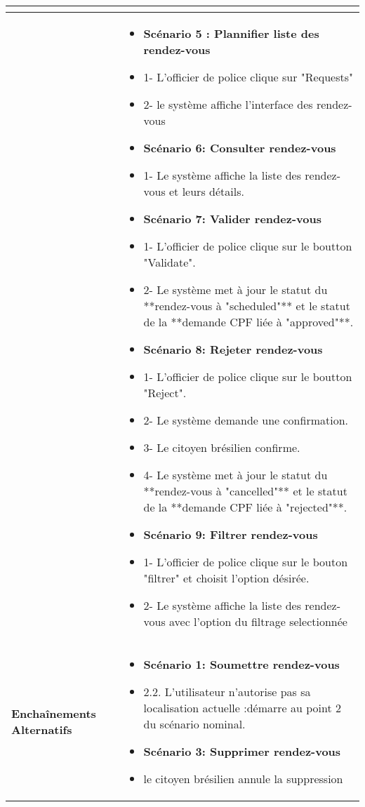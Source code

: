 \begin{longtable}{|>{\arraybackslash}p{4.2cm}|>{\arraybackslash}p{12.5cm}|}
\begin{itemize}[label=]
\end{itemize} \\
\hline
\textbf{}&
\begin{itemize}[label=]

      \item \textbf{Scénario 5 : Plannifier liste des rendez-vous}
            \item 1- L'officier de police clique sur "Requests"
            \item 2- le système affiche l'interface des rendez-vous
             \item\textbf{Scénario 6: Consulter rendez-vous }
            \item 1- Le système affiche la liste des rendez-vous et leurs détails.
      \item\textbf{Scénario 7: Valider rendez-vous }
            \item 1- L'officier de police clique sur le boutton "Validate".
            \item 2- Le système met à jour le statut du **rendez-vous à "scheduled"** et le statut de la **demande CPF liée à "approved"**.
 \item\textbf{Scénario 8: Rejeter rendez-vous }
            \item 1- L'officier de police clique sur le boutton "Reject".
            \item 2- Le système demande une confirmation.
            \item 3- Le citoyen brésilien confirme.
            \item 4- Le système met à jour le statut du **rendez-vous à "cancelled"** et le statut de la **demande CPF liée à "rejected"**.
          \item\textbf{Scénario 9:  Filtrer rendez-vous }
            \item 1- L'officier de police clique sur le bouton "filtrer" et choisit l'option désirée.
             \item 2- Le système affiche la liste des rendez-vous avec l'option du filtrage selectionnée


\end{itemize}\\





\hline
\textbf{Enchaînements Alternatifs} &
\begin{itemize}[label=]
 \item\textbf{Scénario 1: Soumettre rendez-vous}
 \item{2.2.} L'utilisateur n'autorise pas sa localisation actuelle :démarre au point 2 du scénario nominal.
  \item\textbf{Scénario 3: Supprimer rendez-vous}
  \item le citoyen brésilien annule la suppression



\end{itemize}
\end{longtable}
